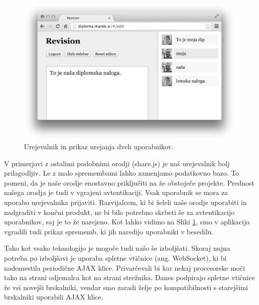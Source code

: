\documentclass[a4paper, 12pt, twoside]{book}
\begin{document}
\vspace*{1cm}

\begin{figure}[placement h]
\begin{center}
\includegraphics[width=14cm]{revision-editor.png}
\end{center}
\caption{Urejevalnik in prikaz urejanja dveh uporabnikov.}
\label{rev-edt}
\end{figure}

V primerjavi z ostalimi podobnimi orodji (share.js) je naš urejevalnik bolj prilagodljiv. Le z malo spremembami lahko zamenjamo podatkovno bazo. To pomeni, da je naše orodje enostavno priključiti na že obstoječe projekte. Prednost našega orodja je tudi v vgrajeni avtentikaciji. Vsak uporabnik se mora za uporabo urejevalnika prijaviti. Razvijalcem, ki bi želeli naše orodje uporabiti in nadgraditi v končni produkt, ne bi bilo potrebno skrbeti še za avtentikacijo uporabnikov, saj je to že narejeno. Kot lahko vidimo na Sliki \ref{rev-edt}, smo v aplikacijo vgradili tudi prikaz sprememb, ki jih naredijo uporabniki v besedilu.

Tako kot vsako tehnologijo je mogoče tudi našo še izboljšati. Skoraj nujna potreba po izboljšavi je uporaba spletne vtičnice (ang. WebSocket), ki bi nadomestila periodične AJAX klice. Privarčevali bi kar nekaj procesorske moči tako na strani odjemalca kot na strani strežnika. Danes podpirajo spletne vtičnice že vsi novejši brskalniki, vendar smo zaradi želje po kompatibilnosti s starejšimi brskalniki uporabili AJAX klice.
\end{document}
